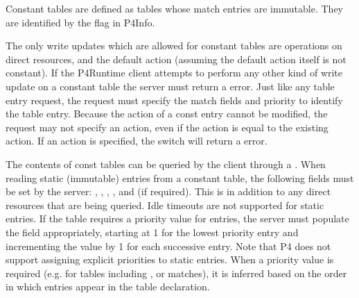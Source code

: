 \documentclass[11pt]{article}
\begin{document}
{%
\noindent{}Constant tables are defined as tables whose match entries are immutable. They
are identified by the  flag in P4Info.%

The only write updates which are allowed for constant tables are 
operations on direct resources, and the default action (assuming the default
action itself is not constant). If the P4Runtime client attempts to perform any
other kind of write update on a constant table the server must return a
 error. Just like any table entry  request, the
request must specify the match fields and priority to identify the table
entry. Because the action of a const entry cannot be modified, the request
may not specify an action, even if the action is equal to the existing action.
If an action is specified, the switch will return a  error.%

The contents of const tables can be queried by the client through a
. When reading static (immutable) entries from a constant table,
the following fields must be set by the server: , , ,
, and  (if required). This is in addition to any
direct resources that are being queried.  Idle timeouts are not supported for
static entries. If the table requires a priority value for entries, the server
must populate the  field appropriately, starting at 1 for the lowest
priority entry and incrementing the value by 1 for each successive entry. Note
that P4 does not support assigning explicit priorities to static
entries. When a priority value is required (e.g. for tables including ,
 or  matches), it is inferred based on the order in which
entries appear in the table declaration.%

}
\end{document}
